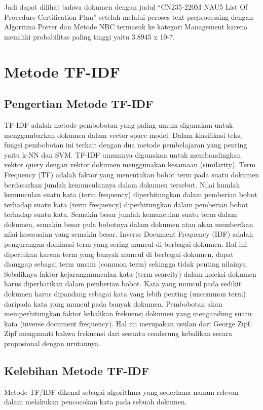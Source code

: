 \par Jadi dapat dilihat bahwa dokumen dengan judul “CN235-220M NAU5 List Of Procedure Certification Plan” setelah melalui peroses text preprocessing dengan Algoritma Porter dan Metode NBC termasuk ke kategori Management karena memiliki probabilitas paling tinggi yaitu 3.8945 x 10-7.


\section{Metode TF-IDF}
\subsection{Pengertian Metode TF-IDF}
TF-IDF adalah metode pembobotan yang
paling umum digunakan untuk menggambarkan
dokumen dalam vector space model. Dalam
klasifikasi teks, fungsi pembobotan ini terkait
dengan dua metode pembelajaran yang penting
yaitu k-NN dan SVM. TF-IDF umumnya
digunakan untuk membandingkan vektor query
dengan vektor dokumen menggunakan
kesamaan (similarity).
Term Frequency (TF) adalah faktor yang
menentukan bobot term pada suatu dokumen
berdasarkan jumlah kemunculannya dalam
dokumen tersebut. Nilai kumlah kemunculan
suatu kata (term frequency) diperhitungkan
dalam pemberian bobot terhadap suatu kata
(term frequency) diperhitungkan dalam
pemberian bobot terhadap suatu kata. Semakin
besar jumlah kemunculan suatu term dalam
dokumen, semakin besar pula bobotnya dalam
dokumen atau akan memberikan nilai
kesesuaian yang semakin besar.
Inverse Document Frequency (IDF) adalah
pengurangan dominasi term yang sering muncul
di berbagai dokumen. Hal ini diperlukan karena
term yang banyak muncul di berbagai
dokumen, dapat dianggap sebagai term umum
(common term) sehingga tidak penting nilainya.
Sebaliknya faktor kejarangmunculan kata (term
scarcity) dalam koleksi dokumen harus
diperhatikan dalam pemberian bobot. Kata yang
muncul pada sedikit dokumen harus dipandang
sebagai kata yang lebih penting (uncommon
term) daripada kata yang muncul pada banyak
dokumen. Pembobotan akan memperhitungkan
faktor kebalikan frekuensi dokumen yang
mengandung suatu kata (inverse document
frequency). Hal ini merupakan usulan dari
George Zipf. Zipf mengamati bahwa frekuensi
dari sesuatu cenderung kebalikan secara
proposional dengan urutannya.

\subsection{Kelebihan Metode TF-IDF}
Metode TF/IDF dikenal sebagai algorithma yang sederhana namun relevan dalam melakukan pencocokan kata pada sebuah dokumen.
